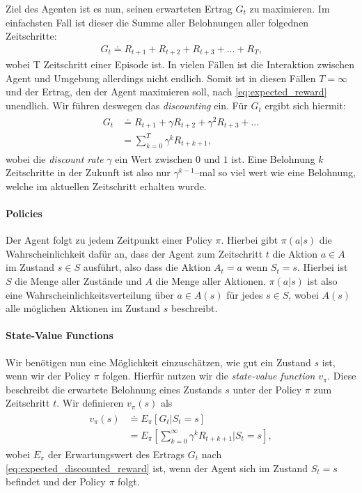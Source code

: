 Ziel des Agenten ist es nun, seinen erwarteten Ertrag $ G_t $ zu maximieren. Im einfachsten Fall ist dieser die Summe aller Belohnungen aller folgednen Zeitschritte:
\begin{align}
    G_t \doteq R_{t + 1} + R_{t + 2} + R_{t + 3} + ... + R_T \text{,} \label{eq:expected_reward}
\end{align}
wobei T Zeitschritt einer Episode ist. In vielen Fällen ist die Interaktion zwischen Agent und Umgebung allerdings nicht endlich. Somit ist in diesen Fällen $ T = \infty $ und der Ertrag, den der Agent maximieren soll, nach \ref{eq:expected_reward} unendlich. Wir führen deswegen das \textit{discounting} ein. Für $ G_t $ ergibt sich hiermit:
\begin{align}
    \begin{split}
        G_t & \doteq R_{t + 1} + \gamma R_{t + 2} + \gamma^2 R_{t + 3} + ...\\
        & = \sum_{k = 0}^{T} \gamma^k R_{t + k + 1} \text{,}
    \end{split} \label{eq:expected_discounted_reward}
\end{align}
wobei die \textit{discount rate} $ \gamma $ ein Wert zwischen $ 0 $ und $ 1 $ ist. Eine Belohnung $ k $ Zeitschritte in der Zukunft ist also nur $ \gamma^{k - 1} $--mal so viel wert wie eine Belohnung, welche im aktuellen Zeitschritt erhalten wurde.

\paragraph{Policies}
Der Agent folgt zu jedem Zeitpunkt einer Policy $ \pi $. Hierbei gibt $ \pi(a|s) $ die Wahrscheinlichkeit dafür an, dass der Agent zum Zeitschritt $ t $ die Aktion $ a \in A $ im Zustand $ s \in S $ ausführt, also dass die Aktion $ A_t = a $ wenn $ S_t = s $. Hierbei ist $ S $ die Menge aller Zustände und $ A $ die Menge aller Aktionen. $ \pi(a|s) $ ist also eine Wahrscheinlichkeitsverteilung über $ a \in A(s) $ für jedes $ s \in S $, wobei $ A(s) $ alle möglichen Aktionen im Zustand $ s $ beschreibt.

\paragraph{State-Value Functions}
Wir benötigen nun eine Möglichkeit einzuschätzen, wie gut ein Zustand $ s $ ist, wenn wir der Policy $ \pi $ folgen. Hierfür nutzen wir die \textit{state-value function} $ v_\pi $. Diese beschreibt die erwartete Belohnung eines Zustands $ s $ unter der Policy $ \pi $ zum Zeitschritt $ t $. Wir definieren $ v_\pi(s) $ als
\begin{align}
    \begin{split}
    v_\pi(s) & \doteq E_\pi \left[G_t | S_t = s \right]\\
    & = E_\pi \left[\sum_{k = 0}^{\infty} \gamma^k R_{t + k + 1} | S_t = s \right],
    \end{split}
\end{align}
wobei $ E_\pi $ der Erwartungswert des Ertrags $ G_t $ nach \ref{eq:expected_discounted_reward} ist, wenn der Agent sich im Zustand $ S_t = s $ befindet und der Policy $ \pi $ folgt.

